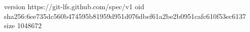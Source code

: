 version https://git-lfs.github.com/spec/v1
oid sha256:6ee735dc560b474595b81959d951d076dbef61a2be2b0951cafc610f53ec6137
size 1048672
